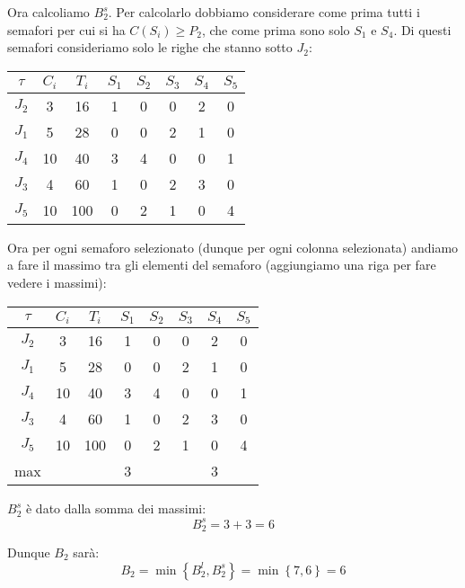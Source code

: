\begin{Esercizio2}
Ora calcoliamo \(B_{2}^{s}\). Per calcolarlo dobbiamo
considerare come prima tutti i semafori per cui si ha 
\(C(S_{i}) \ge P_{2}\), che come prima sono solo
 \(S_{1}\) e \(S_{4}\). Di questi semafori 
 consideriamo solo le righe che stanno sotto \(J_{2}\):


\begin{table}[H]
\centering
\begin{tabular}{|c|c|c|c|c|c|c|c|}
\hline
\(\tau\) & $C_i$ & $T_i$ & $S_1$ & $S_2$ & $S_3$ & $S_4$ & $S_5$ \\
\hline
$J_2$ & 3 & 16 & 1 & 0 & 0 &2 & 0 \\
\arrayrulecolor{red}\hline
\arrayrulecolor{black}
$J_1$ & 5 & 28 & \cellcolor{blue!20}0 & 0 & 2 & \cellcolor{blue!20}1 & 0 \\
\hline
$J_4$ & 10 & 40 & \cellcolor{blue!20}3 & 4 & 0 & \cellcolor{blue!20}0 & 1 \\
\hline
$J_3$ & 4 & 60 & \cellcolor{blue!20}1 & 0 & 2 & \cellcolor{blue!20}3 & 0 \\
\hline
$J_5$ & 10 & 100 & \cellcolor{blue!20}0 & 2 & 1 & \cellcolor{blue!20}0 & 4 \\
\hline
\end{tabular}
\label{tab:task_periodici_esercizio}
\end{table}
Ora per ogni semaforo selezionato (dunque per ogni colonna
selezionata)
andiamo a fare il massimo tra gli elementi del semaforo
(aggiungiamo una riga per fare vedere i massimi):


\begin{table}[H]
\centering
\begin{tabular}{|c|c|c|c|c|c|c|c|}
\hline
\(\tau\) & $C_i$ & $T_i$ & $S_1$ & $S_2$ & $S_3$ & $S_4$ & $S_5$ \\
\hline
$J_2$ & 3 & 16 & 1 & 0 & 0 & 2 & 0 \\
\arrayrulecolor{red}\hline
\arrayrulecolor{black}
$J_1$ & 5 & 28 & \cellcolor{blue!20}0 & 0 & 2 & \cellcolor{blue!20}1 & 0 \\
\hline
$J_4$ & 10 & 40 & \cellcolor{blue!20}3 & 4 & 0 & \cellcolor{blue!20}0 & 1 \\
\hline
$J_3$ & 4 & 60 & \cellcolor{blue!20}1 & 0 & 2 & \cellcolor{blue!20}3 & 0 \\
\hline
$J_5$ & 10 & 100 & \cellcolor{blue!20}0 & 2 & 1 & \cellcolor{blue!20}0 & 4 \\
\hline
max & & & 3 & & & 3 & \\
\hline
\end{tabular}
\label{tab:task_periodici_esercizio}
\end{table}

\(B_{2}^{s}\) è dato dalla somma dei massimi:
\[ B_{2}^{s} = 3 + 3 = 6 \]

Dunque \(B_{2}\) sarà:
\[ B_{2} = \min \left\{B_{2}^{l} , B_{2}^{s}\right\} =
 \min \left\{7 , 6\right\} = 6 \]

\end{Esercizio2}




